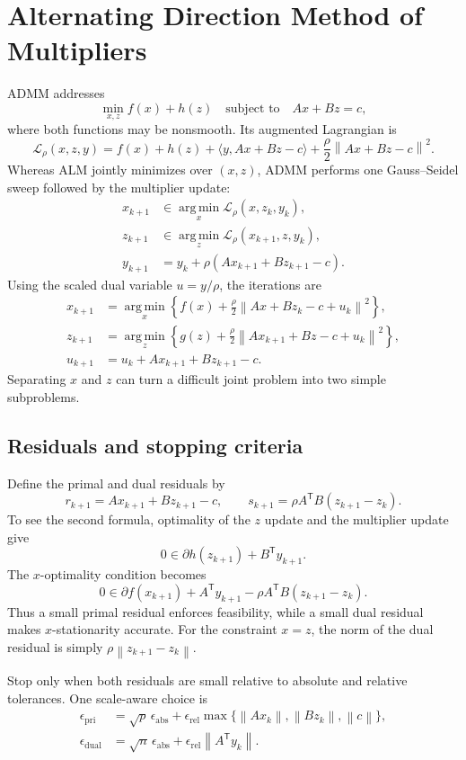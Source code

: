 \documentclass[12pt,oneside]{book}
\numberwithin{equation}{section}
\theoremstyle{definition}
\theoremstyle{plain}
\theoremstyle{remark}
\newcommand{\argmin}{\operatorname*{arg\,min}}
\newcommand{\norm}[1]{\left\lVert #1 \right\rVert}
\begin{document}
\section{Alternating Direction Method of Multipliers}

ADMM addresses
\[
    \min_{x,z}f(x)+h(z)\quad\text{subject to}\quad Ax+Bz=c,
\]
where both functions may be nonsmooth. Its augmented Lagrangian is
\[
 \mathcal L_\rho(x,z,y)=f(x)+h(z)+\langle y,Ax+Bz-c\rangle
 +\frac\rho2\norm{Ax+Bz-c}^2.
\]
Whereas ALM jointly minimizes over $(x,z)$, ADMM performs one
Gauss--Seidel sweep followed by the multiplier update:
\begin{align*}
 x_{k+1}&\in\argmin_x\mathcal L_\rho(x,z_k,y_k),\\
 z_{k+1}&\in\argmin_z\mathcal L_\rho(x_{k+1},z,y_k),\\
 y_{k+1}&=y_k+\rho(Ax_{k+1}+Bz_{k+1}-c).
\end{align*}
Using the scaled dual variable $u=y/\rho$, the iterations are
\begin{align*}
 x_{k+1}&=\argmin_x\left\{
 f(x)+\frac\rho2\norm{Ax+Bz_k-c+u_k}^2\right\},\\
 z_{k+1}&=\argmin_z\left\{
 g(z)+\frac\rho2\norm{Ax_{k+1}+Bz-c+u_k}^2\right\},\\
 u_{k+1}&=u_k+Ax_{k+1}+Bz_{k+1}-c.
\end{align*}
Separating $x$ and $z$ can turn a difficult joint problem into two simple
subproblems.

\subsection{Residuals and stopping criteria}

Define the primal and dual residuals by
\begin{equation}\label{eq:admm-residuals}
 r_{k+1}=Ax_{k+1}+Bz_{k+1}-c,
 \qquad
 s_{k+1}=\rho A^\mathsf TB(z_{k+1}-z_k).
\end{equation}
To see the second formula, optimality of the $z$ update and the multiplier
update give
\[
 0\in\partial h(z_{k+1})+B^\mathsf Ty_{k+1}.
\]
The $x$-optimality condition becomes
\[
 0\in\partial f(x_{k+1})+A^\mathsf Ty_{k+1}
       -\rho A^\mathsf TB(z_{k+1}-z_k).
\]
Thus a small primal residual enforces feasibility, while a small dual
residual makes $x$-stationarity accurate. For the constraint $x=z$, the norm
of the dual residual is simply $\rho\norm{z_{k+1}-z_k}$.

Stop only when both residuals are small relative to absolute and relative
tolerances. One scale-aware choice is
\begin{align*}
 \epsilon_{\mathrm{pri}}
 &=\sqrt p\,\epsilon_{\mathrm{abs}}+\epsilon_{\mathrm{rel}}
 \max\{\norm{Ax_k},\norm{Bz_k},\norm c\},\\
 \epsilon_{\mathrm{dual}}
 &=\sqrt n\,\epsilon_{\mathrm{abs}}+\epsilon_{\mathrm{rel}}
 \norm{A^\mathsf Ty_k}.
\end{align*}
\end{document}
